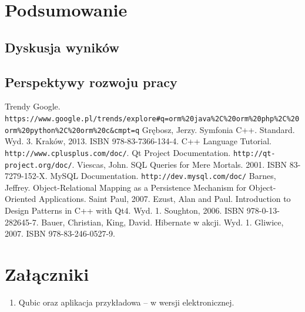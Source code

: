 \documentclass[12pt]{report}
\begin{document}
\chapter{Podsumowanie} \label{podsumowanie}

\section{Dyskusja wyników}

\section{Perspektywy rozwoju pracy} 

\begin{thebibliography}{99}
 Trendy Google. {\tt https://www.google.pl/trends/explore\#q=orm\%20\-java\%2C\%20orm\%20php\%2C\%20orm\%20python\%2C\%20orm\%20c\&cmpt=q}
 Grębosz, Jerzy. Symfonia C++. Standard. Wyd. 3. Kraków, 2013. ISBN 978-83-7366-134-4.
 C++ Language Tutorial. {\tt http://www.cplusplus.com/doc/}.
Qt Project Documentation. {\tt http://qt-project.org/doc/}.
 Viescas, John. SQL Queries for Mere Mortals. 2001. ISBN 83-7279-152-X.
 MySQL Documentation. {\tt http://dev.mysql.com/doc/}
 Barnes, Jeffrey. Object-Relational Mapping as a Persistence Mechanism for Object-Oriented Applications. Saint Paul, 2007.
 Ezust, Alan and Paul. Introduction to Design Patterns in C++ with Qt4. Wyd. 1. Soughton, 2006. ISBN 978-0-13-282645-7.
 Bauer, Christian, King, David. Hibernate w akcji. Wyd. 1. Gliwice, 2007. ISBN 978-83-246-0527-9.

\end{thebibliography}

\listoffigures

\listoftables

\chapter*{Załączniki}
\begin{enumerate}
\item Qubic oraz aplikacja przykładowa -- w wersji elektronicznej.
\end{enumerate}
\end{document}
